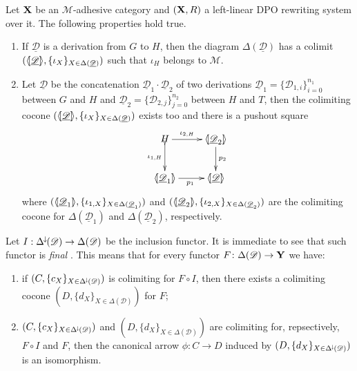 \documentclass[a4paper,UKenglish,cleveref,pdftex, thm-restate,numberwithinsect]{lipics}
\newcommand{\Deltamin}{\Delta^{\hspace{-1pt}\downarrow\hspace{-1pt}}}
\def\R{\mathsf{R}}
\def\X{\textbf {\textup{X}}}
\def\Y{\textbf {\textup{Y}}}
\newcommand{\dder}[1]{\mathscr{#1}}
\newcommand{\der}[1]{\underline{\dder{#1}}}
\newcommand{\lpro}{\langle \hspace{-1.85pt}[}
\newcommand{\rpro}{]\hspace{-1.85pt}\rangle}
\newcommand{\tpro}[1]{\lpro \der{#1}\rpro}
\newcommand{\tproi}[2]{\lpro \der{#1}_{#2}\rpro}
\begin{document}
\begin{lemma}\label{lem:colim}
	Let $\X$ be an $\mathcal{M}$-adhesive category and $(\X, \R)$ a left-linear DPO rewriting system over it. The following properties hold true.
	\begin{enumerate}
		\item  If $\der{D}$ is a derivation from $G$ to $H$, then the diagram $\Delta(\der{D})$ has a colimit $(\tpro{D}, \{\iota_X\}_{X\in \Delta(\der{D})})$ such that $\iota_H$ belongs to $\mathcal{M}$.
		\item Let $\der{D}$ be the concatenation $\der{D}_1\cdot \der{D}_2$ of two derivations $\der{D}_1=\{\dder{D}_{1,i}\}_{i=0}^{n_1}$ between $G$ and $H$ and $\der{D}_2=\{\dder{D}_{2,j}\}_{j=0}^{n_2}$ between $H$ and $T$,  then the colimiting cocone $(\tpro{D}, \{\iota_X\}_{X\in \Delta(\der{D})})$ exists too and there is a pushout square
		\[\xymatrix{H\ar[r]^-{\iota_{2, H}} \ar@{>->}[d]_-{\iota_{1, H}} & \tproi{D}{2} \ar[d]^{p_2}\\  \tproi{D}{1} \ar[r]_{p_1}& \tpro{D}}\]
		where $(\tproi{D}{1}, \{\iota_{1, X}\}_{X\in \Delta(\der{D}_1)})$ and $(\tproi{D}{2}, \{\iota_{2, X}\}_{X\in \Delta(\der{D}_2)})$ are the colimiting cocone for $\Delta(\der{D}_1)$ and $\Delta(\der{D}_2)$, respectively.
	\end{enumerate}
\end{lemma}
\begin{remark}\label{rem:cof}
Let $I:\Deltamin(\dder{D})\to \Delta(\dder{D})$ be the inclusion functor. It is immediate to see that such functor is \emph{final} \cite{mac2013categories}. This means that for every functor $F\colon \Delta(\dder{D})\to \Y$ we have:
\begin{enumerate}
	\item if  $(C, \{c_X\}_{X\in \Deltamin(\dder{D})})$ is colimiting for $F\circ I$, then there exists a colimiting cocone $(D, \{d_X\}_{X\in \Delta(\dder{D})})$ for $F$;
	\item $(C, \{c_X\}_{X\in \Deltamin(\dder{D})})$ and $(D, \{d_X\}_{X\in \Delta(\dder{D})})$ are colimiting for, repsectively, $F\circ I$ and $F$, then the canonical arrow $\phi\colon C\to D$ induced by $(D, \{d_X\}_{X\in \Deltamin(\dder{D})})$ is an isomorphism.
\end{enumerate}
\end{remark}
\end{document}
